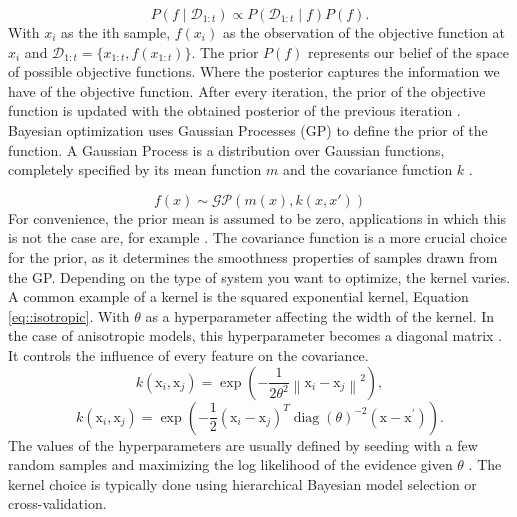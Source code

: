 \begin{equation}
P(f \mid \mathcal{D}_{1:t}) \propto P(\mathcal{D}_{1:t}\mid f) P(f) .
\end{equation}
With $x_i$ as the ith sample, $f(x_i)$ as the observation of the objective function at $x_i$ and $\mathcal{D}_{1:t} = \{x_{1:t},f(x_{1:t})\}$. The prior $P(f)$ represents our belief of the space of possible objective functions. Where the posterior captures the information we have of the objective function. After every iteration, the prior of the objective function is updated with the obtained posterior of the previous iteration . Bayesian optimization uses Gaussian Processes (GP) to define the prior of the function. A Gaussian Process is a distribution over Gaussian functions, completely specified by its mean function $m$ and the covariance function $k$ \cite{bo_tutorial}. 

\begin{equation}
    f(x) \sim \mathcal{GP}(m(x), k(x,x'))
\end{equation}
For convenience, the prior mean is assumed to be zero, applications in which this is not the case are, for example \cite{MartinezCantin, Brochu2010}. The covariance function is a more crucial choice for the prior, as it determines the smoothness properties of samples drawn from the GP. Depending on the type of system you want to optimize, the kernel varies. A common example of a kernel is the squared exponential kernel, Equation \ref{eq::isotropic}. With $\theta$ as a hyperparameter affecting the width of the kernel. In the case of anisotropic models, this hyperparameter becomes a diagonal matrix \cite{rasmussen2006gaussian}. It controls the influence of every feature on the covariance.
\begin{equation}\label{eq::isotropic}
k\left(\mathrm{x}_i, \mathrm{x}_j\right)=\exp \left(-\frac{1}{2 \theta^2}\left\|\mathrm{x}_i-\mathrm{x}_j\right\|^2\right),
\end{equation}
\begin{equation}\label{eq::anistropic}
k\left(\mathrm{x}_i, \mathrm{x}_j\right)=\exp \left(-\frac{1}{2}\left(\mathrm{x}_i-\mathrm{x}_j\right)^T \operatorname{diag}(\theta)^{-2}\left(\mathrm{x}-\mathrm{x}^{\prime}\right)\right).
\end{equation}
The values of the hyperparameters are usually defined by seeding with a few random samples and maximizing the log likelihood of the evidence given $\theta$ \cite{rasmussen2006gaussian, santner2003design}. The kernel choice is typically done using hierarchical Bayesian model selection \cite{mackay1992practical} or cross-validation. 

